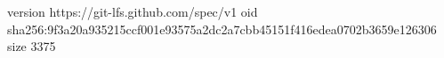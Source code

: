 version https://git-lfs.github.com/spec/v1
oid sha256:9f3a20a935215ccf001e93575a2dc2a7cbb45151f416edea0702b3659e126306
size 3375
